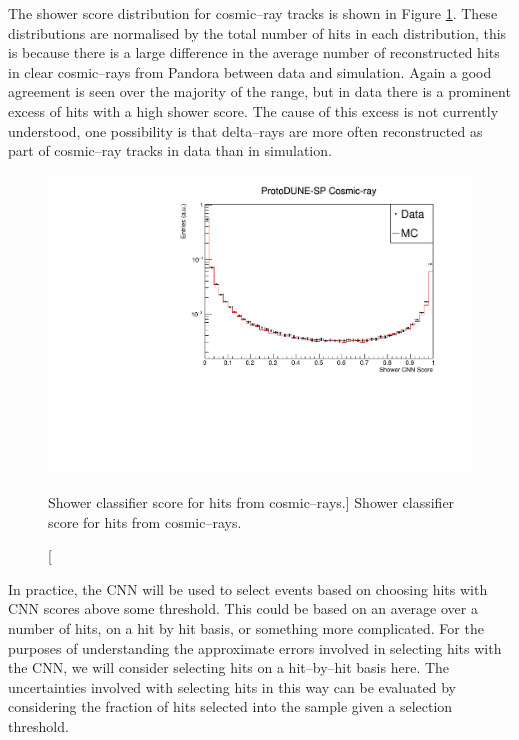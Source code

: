 The shower score distribution for cosmic--ray tracks is shown in Figure
\ref{fig:cosmic_muon_cnn}. These distributions are normalised by the total
number of hits in each distribution, this is because there is a large difference
in the average number of reconstructed hits in clear cosmic--rays from Pandora
between data and simulation. Again a good agreement is seen over the majority 
of the range, but in data there is a prominent excess of hits with a high 
shower score. The cause of this excess is not currently understood, one
possibility is that delta--rays are more often reconstructed as part of
cosmic--ray tracks in data than in simulation.

\begin{figure}
	\centering
	\includegraphics[width=\textwidth]{figures/hit_cnn_cosmics.pdf}
	\caption
	[Shower classifier score for hits from cosmic--rays.]
	{Shower classifier score for hits from cosmic--rays.}
	\label{fig:cosmic_muon_cnn}
\end{figure}

\bigskip
\noindent
In practice, the CNN will be used to select events based on choosing hits with 
CNN scores above some threshold. This could be based on an average over a 
number of hits, on a hit by hit basis, or something more complicated. For the
purposes of understanding the approximate errors involved in selecting hits with
the CNN, we will consider selecting hits on a hit--by--hit basis here.  The 
uncertainties involved with selecting hits in this way can be evaluated by 
considering the fraction of hits selected into the sample given a selection 
threshold. 

